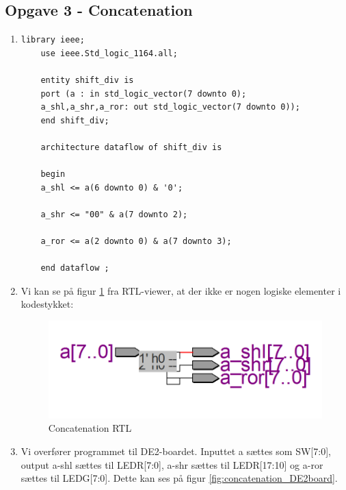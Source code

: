 \subsection{Opgave 3 - Concatenation}
\begin{enumerate}
	\item[1)]
		\begin{lstlisting}[caption={Concatenation kode},label={lst:ConcatenationCode}]
	library ieee;
	use ieee.Std_logic_1164.all;
	
	entity shift_div is
	port (a : in std_logic_vector(7 downto 0);
	a_shl,a_shr,a_ror: out std_logic_vector(7 downto 0));
	end shift_div; 
	
	architecture dataflow of shift_div is
	
	begin 
	a_shl <= a(6 downto 0) & '0';
	
	a_shr <= "00" & a(7 downto 2);
	
	a_ror <= a(2 downto 0) & a(7 downto 3);
	
	end dataflow ;

		\end{lstlisting}
	\item[2)]
Vi kan se på figur \ref{fig:concatenationRTL} fra RTL-viewer, at der ikke er nogen logiske elementer i kodestykket:
	\begin{figure}[H]
		\centering
		\includegraphics[scale=0.5]{pictures/Oevelse3/Concatenation_RTL.png}
		\caption{Concatenation RTL}
		\label{fig:concatenationRTL}
	\end{figure}

	
	\item[3)]
Vi overfører programmet til DE2-boardet. Inputtet a sættes som SW[7:0], output a-shl sættes til LEDR[7:0], a-shr sættes til LEDR[17:10] og a-ror sættes til LEDG[7:0]. Dette kan ses på figur \ref{fig:concatenation_DE2board}.


\end{enumerate}
